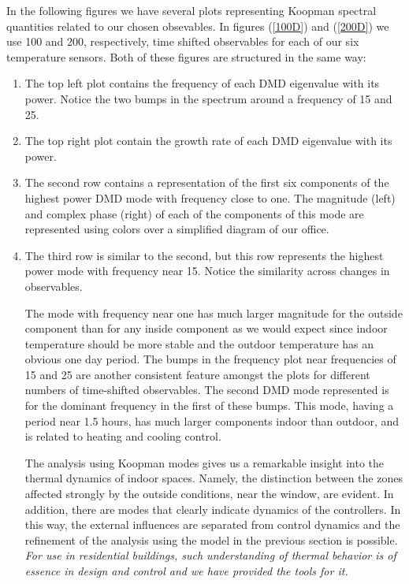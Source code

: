 \documentclass{article}
\begin{document}
In the following figures we have several plots representing Koopman spectral quantities related to our chosen obsevables. In figures (\ref{100D}) and (\ref{200D}) we use 100 and 200, respectively, time shifted observables for each of our six temperature sensors. Both of these figures are structured in the same way:
\begin{enumerate}
\item %
The top left plot contains the frequency of each DMD eigenvalue with its power. Notice the two bumps in the spectrum around a frequency of 15 and 25.
\item %
The top right plot contain the growth rate of each DMD eigenvalue with its power. 
\item %
The second row contains a representation of the first six components of the highest power DMD mode with frequency close to one. The magnitude (left) and complex phase (right) of each of the components of this mode are represented using colors over a simplified diagram of our office.
\item %
The third row is similar to the second, but this row represents the highest power mode with frequency near 15. Notice the similarity across changes in observables.

The mode with frequency near one has much larger magnitude for the outside component than for any inside component as we would expect since indoor temperature should be more stable and the outdoor temperature has an obvious one day period. The bumps in the frequency plot near frequencies of 15 and 25 are another consistent feature amongst the plots for different numbers of time-shifted observables. The second DMD mode represented is for the dominant frequency in the first of these bumps. This mode, having a period near 1.5 hours, has much larger components indoor than outdoor, and is related to heating and cooling control. 

The analysis using Koopman modes gives us a remarkable insight into the thermal dynamics of indoor spaces. Namely, the distinction between the zones affected strongly by the outside conditions, near the window, are evident. In addition, there are modes that clearly indicate dynamics of the controllers. In this way, the external influences are separated from control dynamics and the refinement of the analysis using the model in the previous section is possible. {\it For use in residential buildings, such understanding of thermal behavior is of essence in design and control and we have provided the tools for it.}
\end{enumerate}
\end{document}
